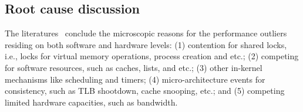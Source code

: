 \documentclass[pageno]{jpaper}
\begin{document}
\subsection{Root cause discussion}\label{motivation_discussion}

The literatures~\cite{litales, Boyd-Wickizer:2010:MOSBench, gough2007kernel} conclude the microscopic reasons for the performance outliers residing on both software and hardware levels: (1) contention for shared locks, i.e., locks for virtual memory operations, process creation and etc.; (2) competing for software resources, such as caches, lists, and etc.; (3) other in-kernel mechanisms like scheduling and timers; (4) micro-architecture events for consistency, such as TLB shootdown, cache snooping, etc.; and (5) competing limited hardware capacities, such as bandwidth.
\end{document}
